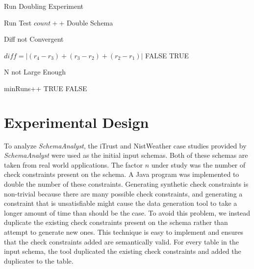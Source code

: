 \documentclass[smallextended]{svjour3}       %
\begin{document}
\begin{algorithm}[t]
    \caption{Run Doubling Experiment}
    \begin{algorithmic}
        \STATE Run Test
        \STATE $\mathit{count}++$
        \ENDFOR
        \STATE Double Schema
        \ENDWHILE
    \end{algorithmic}
    \label{alg:main}
  \end{algorithm}

 \begin{algorithm}[t]
    \caption{Diff not Convergent}
    \begin{algorithmic}
      \STATE $\mathit{diff} = |(r_4 - r_3) + (r_3 -r_2) + (r_2 - r_1)|$
      \RETURN FALSE
      \ELSE
      \RETURN TRUE
      \ENDIF
    \end{algorithmic}
    \label{alg:convergence}
  \end{algorithm}

 \begin{algorithm}[t]
    \caption{N not Large Enough}
    \begin{algorithmic}
      \STATE minRuns++
      \RETURN TRUE
      \ENDIF
      \ENDIF
      \RETURN FALSE
    \end{algorithmic}
    \label{alg:tuning}
  \end{algorithm}

\section{Experimental Design}
To analyze \textit{SchemaAnalyst}, the iTrust and NistWeather case
studies provided by \textit{SchemaAnalyst} were used as the initial 
input schemas.
Both of these schemas are taken from real world applications. The factor $n$
under study was the number of check constraints present on the schema.  
A Java program was
implemented to double the number of these constraints. Generating
synthetic check constraints is non-trivial because there are many
possible check constraints, and generating a constraint that is
unsatisfiable might cause the data generation tool to take a longer
amount of time than should be the case. To avoid this problem, we
instead duplicate the existing check constraints present on the schema
rather than attempt to generate new ones. This technique is easy
to implement and ensures that the check constraints added are
semantically valid.  For every table in the input schema, the tool 
duplicated the existing check constraints and added the duplicates 
to the table.  
\end{document}
